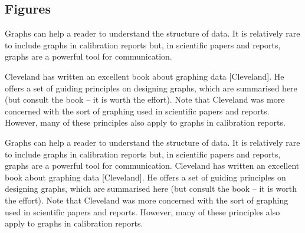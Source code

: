 \subsection{Figures}
Graphs can help a reader to understand the structure of data. It is relatively rare to include graphs in calibration reports but, in scientific papers and reports, graphs are a powerful tool for communication.

Cleveland has written an excellent book about graphing data [Cleveland]. He offers a set of guiding principles on designing graphs, which are summarised here (but consult the book – it is worth the effort). Note that Cleveland was more concerned with the sort of graphing used in scientific papers and reports. However, many of these principles also apply to graphs in calibration reports.

Graphs can help a reader to understand the structure of data. It is relatively rare to include graphs in calibration reports but, in scientific papers and reports, graphs are a powerful tool for communication.
Cleveland has written an excellent book about graphing data [Cleveland]. He offers a set of guiding principles on designing graphs, which are summarised here (but consult the book – it is worth the effort). Note that Cleveland was more concerned with the sort of graphing used in scientific papers and reports. However, many of these principles also apply to graphs in calibration reports.

